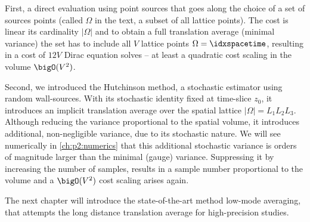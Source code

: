 First, a direct evaluation using point sources that goes along the choice of a set of sources points (called $\Omega$ in the text, a subset of all lattice points).
The cost is linear its cardinality $\lvert \Omega \rvert$ and to obtain a full translation average (\ie minimal variance) the set has to include all $V$ lattice points $\Omega = \idxspacetime$, resulting in a cost of $12 V$ Dirac equation solves -- at least a quadratic cost scaling in the volume $\bigO(V^{2})$.

Second, we introduced the Hutchinson method, a stochastic estimator using random wall-sources.
With its stochastic identity fixed at time-slice $z_0$, it introduces an implicit translation average over the spatial lattice $\lvert \Omega \rvert = L_1 L_2 L_3$.
Although reducing the variance proportional to the spatial volume, it introduces additional, non-negligible variance, due to its stochastic nature.
We will see numerically in \cref{ch:p2:numerics} that this additional stochastic variance is orders of magnitude larger than the minimal (gauge) variance.
Suppressing it by increasing the number of samples, results in a sample number proportional to the volume and a $\bigO(V^{2})$ cost scaling arises again.

The next chapter will introduce the state-of-the-art method low-mode averaging, that attempts the long distance translation average for high-precision studies.

